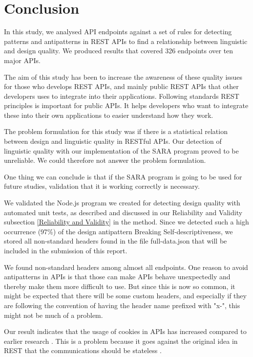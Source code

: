 \section{Conclusion}

In this study, we analysed API endpoints against a set of rules for detecting patterns and antipatterns in REST APIs to find a relationship between linguistic and design quality. We produced results that covered 326 endpoints over ten major APIs. 

The aim of this study has been to increase the awareness of these quality issues for those who develops REST APIs, and mainly public REST APIs that other developers uses to integrate into their applications. Following standards REST principles is important for public APIs.  It helps developers who want to integrate these into their own applications to easier understand how they work.

The problem  formulation for this study was if there is a statistical relation between design and linguistic quality in RESTful APIs. Our detection of linguistic quality with our implementation of the SARA program proved to be unreliable. We could therefore not answer the problem formulation. 

 
One thing we can conclude is that if the SARA program is going to be used for future studies, validation that it is working correctly is necessary.

 
We validated the Node.js program we created for detecting design quality with automated unit tests, as described and discussed in our Reliability and Validity subsection \ref{Reliability and Validity} in the method. Since we detected such a high occurrence (97\%) of the design antipattern Breaking Self-descriptiveness, we stored all non-standard headers found in the file full-data.json that will be included in the submission of this report.

 
We found non-standard headers among almost all endpoints. One reason to avoid antipatterns in APIs is that those can make APIs behave unexpectedly and thereby make them more difficult to use. But since this is now so common, it might be expected that there will be some custom headers, and especially if they are following the convention of having the header name prefixed with "x-", this might not be much of a problem.

 
Our result indicates that the usage of cookies in APIs has increased compared to earlier research \cite{design}. This is a problem because it goes against the original idea in REST that the communications should be stateless \cite{restdissertation}\cite{design}.

